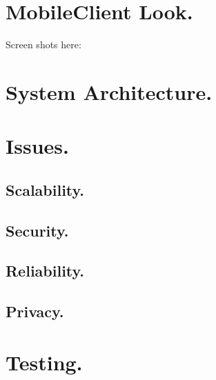 \documentclass[10pt,a4paper]{article}
\begin{document}
\section*{MobileClient Look.}
\newpage
Screen shots here:
\section*{System Architecture.}
\newpage
\section*{Issues.}

\subsection*{Scalability.}
\subsection*{Security.}
\subsection*{Reliability.}
\subsection*{Privacy.}
\newpage
\section*{Testing.}
\end{document}
